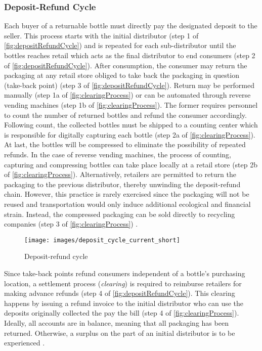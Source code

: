 \subsubsection{Deposit-Refund Cycle}
Each buyer of a returnable bottle must directly pay the designated deposit to the seller. This process starts with the initial distributor (step 1 of \autoref{fig:depositRefundCycle}) and is repeated for each sub-distributor until the bottles reaches retail which acts as the final distributor to end consumers (step 2 of \autoref{fig:depositRefundCycle}). After consumption, the consumer may return the packaging at any retail store obliged to take back the packaging in question (take-back point) (step 3 of \autoref{fig:depositRefundCycle}). Return may be performed manually (step 1a of \autoref{fig:clearingProcess}) or can be automated through reverse vending machines (step 1b of \autoref{fig:clearingProcess}). The former requires personnel to count the number of returned bottles and refund the consumer accordingly. Following count, the collected bottles must be shipped to a counting center which is responsible for digitally capturing each bottle (step 2a of \autoref{fig:clearingProcess}). At last, the bottles will be compressed to eliminate the possibility of repeated refunds. In the case of reverse vending machines, the process of counting, capturing and compressing bottles can take place locally at a retail store (step 2b of \autoref{fig:clearingProcess}). Alternatively, retailers are permitted to return the packaging to the previous distributor, thereby unwinding the deposit-refund chain. However, this practice is rarely exercised since the packaging will not be reused and transportation would only induce additional ecological and financial strain. Instead, the compressed packaging can be sold directly to recycling companies (step 3 of \autoref{fig:clearingProcess}) \cite[p.~16-17]{Hartlep2011Recycling} \cite{reiling}.  

\begin{figure}[hbt]
  \centering
  \texttt{[image: images/deposit\_cycle\_current\_short]}
  \caption{Deposit-refund cycle \cite[p.~14]{Hartlep2011Recycling}}
  \label{fig:depositRefundCycle}
\end{figure}

Since take-back points refund consumers independent of a bottle’s purchasing location, a settlement process (\textit{clearing}) is required to reimburse retailers for making advance refunds (step 4 of \autoref{fig:depositRefundCycle}). This clearing happens by issuing a refund invoice to the initial distributor who can use the deposits originally collected the pay the bill (step 4 of \autoref{fig:clearingProcess}). Ideally, all accounts are in balance, meaning that all packaging has been returned. Otherwise, a surplus on the part of an initial distributor is to be experienced \cite[p.~17]{Hartlep2011Recycling}.

